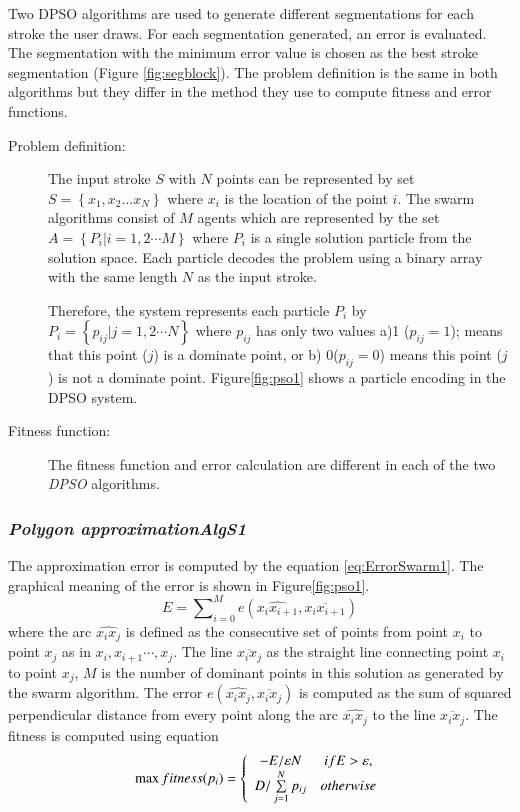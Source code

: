 \documentclass[preprint,1p,times,review]{elsarticle}
\begin{document}
Two DPSO algorithms are used to generate different segmentations for each stroke the user draws. For each segmentation generated, an error is evaluated. The segmentation with the minimum error value is chosen as the best stroke segmentation (Figure \ref{fig:segblock}). The problem definition is the same in both algorithms but they differ in the method they use to compute fitness and error functions.
\begin{description}
	\item[ Problem definition:] The input stroke $S$  with $N$ points can be
represented by set $S = \left\{ {x_1 ,x_2  \ldots x_N }\right\}$ where $x_i$ is the location of the point $i$. The swarm algorithms consist of $M$ agents which are represented by the set $A = \left\{ {P_i \left| {i = 1,2 \cdots M} \right.} \right\}$ where $P_i$ is a single solution particle from the solution space. Each particle decodes the problem using a binary array with the same length $N$ as the input stroke.

Therefore, the system represents each particle $P_i$ by $P_i = \left\{ {p_{ij}
\left| {j = 1,2 \cdots N} \right.} \right\}$ where $p_{ij}$ has only two values a)1 ($p_{ij}=1$); means that this point ($j$) is a dominate point, or b) 0($p_{ij}=0$) means this point ($j$) is not a dominate point. Figure\ref{fig:pso1} shows a particle encoding in the DPSO system.
\item[Fitness function:] The fitness function and error calculation are different in each of the two \textit{DPSO} algorithms.
	\end{description}
\subsubsection{\textit{Polygon approximation\textsl{AlgS1}}}
The approximation error is computed by the equation \ref{eq:ErrorSwarm1}. The
graphical meaning of the error is shown in Figure\ref{fig:pso1}.%
\begin{equation}
E=\sum\nolimits_{i = 0}^M e ( \widehat{x_ix_{i+1}},\overline{x_i x_{i+1}}) \label{eq:ErrorSwarm1} \end{equation}
where the arc $\widehat{x_ix_j}$ is defined as the consecutive set of points from point $x_i$ to point $x_{j}$ as in $x_i,x_{i+1} \cdots,x_j$. The line $\overline{x_i x_j} $ as the straight line connecting point $x_i$ to point $x_j$, $M$ is the number of dominant points in this solution as generated by the swarm algorithm. The error $e ( \widehat{x_ix_j},\overline{x_i x_j})$ is computed as the sum of squared perpendicular distance from every point along the arc $\widehat{x_ix_j}$ to the line $\overline{x_i x_j}$. The fitness is computed
using equation %
\begin{equation}
\max fitness(p_i ) = \left\{ {\begin{array}{*{20}c}
   { - E/\varepsilon N} & {ifE > \varepsilon ,}  \\
   {D/\sum\limits_{j = 1}^N {p_{ij} } } & {otherwise}  \\
   \end{array}} \right. \label{eq:fitnessSwarm1} \end{equation}
\end{document}
